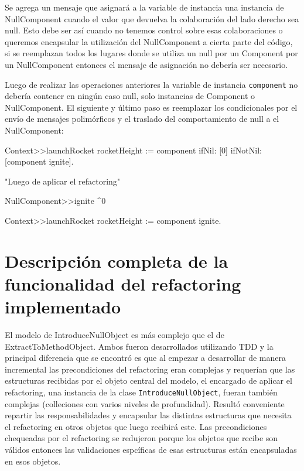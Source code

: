 Se agrega un mensaje que asignará a la variable de instancia una instancia de NullComponent cuando
el valor que devuelva la colaboración del lado derecho sea null. Esto debe ser así cuando no tenemos
control sobre esas colaboraciones o queremos encapsular la utilización del NullComponent a cierta parte
del código, si se reemplazan todos los lugares donde se utiliza un null por un Component por un NullComponent
entonces el mensaje de asignación no debería ser necesario.

Luego de realizar las operaciones anteriores la variable de instancia \lstinline{component} no
debería contener en ningún caso null, solo instancias de Component o NullComponent. El siguiente y
último paso es reemplazar los condicionales por el envío de mensajes polimórficos y el traslado
del comportamiento de null a el NullComponent:

\begin{code}
Context>>launchRocket
    rocketHeight := component ifNil: [0] ifNotNil: [component ignite].

"Luego de aplicar el refactoring"

NullComponent>>ignite
    ^0

Context>>launchRocket
    rocketHeight := component ignite.
\end{code}



\section{Descripción completa de la funcionalidad del refactoring implementado}

El modelo de IntroduceNullObject es más complejo que el de ExtractToMethodObject. Ambos fueron desarrollados
utilizando TDD y la principal diferencia que se encontró es que al empezar a desarrollar de manera incremental
las precondiciones del refactoring eran complejas y requerían que las estructuras recibidas
por el objeto central del modelo, el encargado de aplicar el refactoring, una instancia de la clase
\lstinline{IntroduceNullObject}, fueran también complejas (colleciones con varios niveles de profundidad).
Resultó conveniente repartir las responsabilidades y encapsular las distintas estructuras que necesita
el refactoring en otros objetos que luego recibirá este. Las precondiciones chequeadas por el refactoring
se redujeron porque los objetos que recibe son válidos entonces las validaciones espcíficas de esas estructuras
están encapsuladas en esos objetos.


